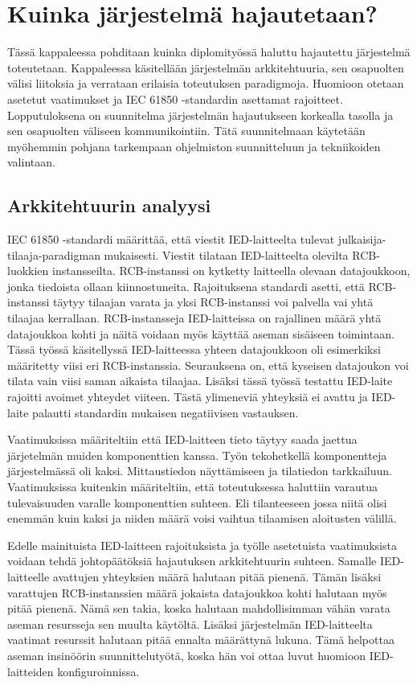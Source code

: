 \chapter{Kuinka järjestelmä hajautetaan?}
Tässä kappaleessa pohditaan kuinka diplomityössä haluttu hajautettu järjestelmä toteutetaan. Kappaleessa käsitellään järjestelmän arkkitehtuuria, sen osapuolten välisi liitoksia ja verrataan erilaisia toteutuksen paradigmoja. Huomioon otetaan asetetut vaatimukset ja IEC 61850 -standardin asettamat rajoitteet. Lopputuloksena on suunnitelma järjestelmän hajautukseen korkealla tasolla ja sen osapuolten väliseen kommunikointiin. Tätä suunnitelmaan käytetään myöhemmin pohjana tarkempaan ohjelmiston suunnitteluun ja tekniikoiden valintaan.


\section{Arkkitehtuurin analyysi}
\label{ch:architecture-analysis}
IEC 61850 -standardi määrittää, että viestit IED-laitteelta tulevat julkaisija-tilaaja-pa\-ra\-dig\-man mukaisesti. Viestit tilataan IED-laitteelta olevilta RCB-luokkien instansseilta. RCB-instanssi on kytketty laitteella olevaan datajoukkoon, jonka tiedoista ollaan kiinnostuneita. Rajoituksena standardi asetti, että RCB-instanssi täytyy tilaajan varata ja yksi RCB-instanssi voi palvella vai yhtä tilaajaa kerrallaan. RCB-instansseja IED-laitteissa on rajallinen määrä yhtä datajoukkoa kohti ja näitä voidaan myös käyttää aseman sisäiseen toimintaan. Tässä työssä käsitellyssä IED-laitteessa yhteen datajoukkoon oli esimerkiksi määritetty viisi eri RCB-instanssia. Seurauksena on, että kyseisen datajoukon voi tilata vain viisi saman aikaista tilaajaa. Lisäksi tässä työssä testattu IED-laite rajoitti avoimet yhteydet viiteen. Tästä ylimeneviä yhteyksiä ei avattu ja IED-laite palautti standardin mukaisen negatiivisen vastauksen.

Vaatimuksissa määriteltiin että IED-laitteen tieto täytyy saada jaettua järjetelmän muiden komponenttien kanssa. Työn tekohetkellä komponentteja järjestelmässä oli kaksi. Mittaustiedon näyttämiseen ja tilatiedon tarkkailuun. Vaatimuksissa kuitenkin määriteltiin, että toteutuksessa haluttiin varautua tulevaisuuden varalle komponenttien suhteen. Eli tilanteeseen jossa niitä olisi enemmän kuin kaksi ja niiden määrä voisi vaihtua tilaamisen aloitusten välillä. 

Edelle mainituista IED-laitteen rajoituksista ja työlle asetetuista vaatimuksista voidaan tehdä johtopäätöksiä hajautuksen arkkitehtuurin suhteen. Samalle IED-laitteelle avattujen yhteyksien määrä halutaan pitää pienenä. Tämän lisäksi varattujen RCB-instanssien määrä jokaista datajoukkoa kohti halutaan myös pitää pienenä. Nämä sen takia, koska halutaan mahdollisimman vähän varata aseman resursseja sen muulta käytöltä. Lisäksi järjestelmän IED-laitteelta vaatimat resurssit halutaan pitää ennalta määrättynä lukuna. Tämä helpottaa aseman insinöörin suunnittelutyötä, koska hän voi ottaa luvut huomioon IED-laitteiden konfiguroinnissa.

